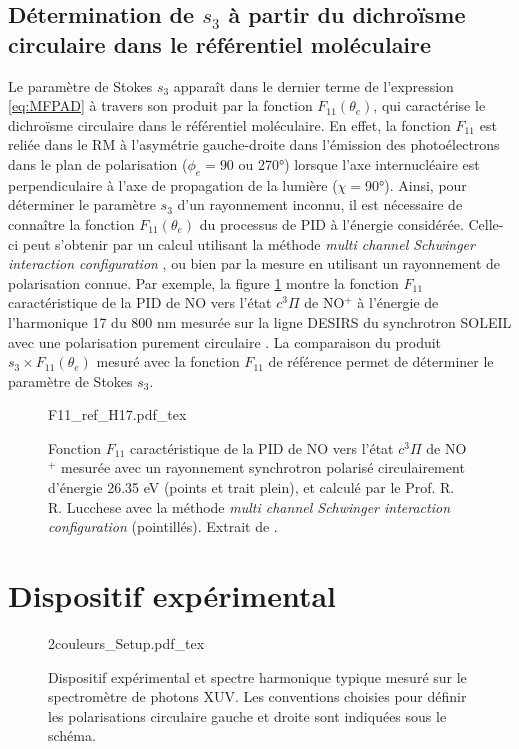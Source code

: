 \subsection{Détermination de $s_3$ à partir du dichroïsme circulaire dans le référentiel moléculaire}
Le paramètre de Stokes $s_3$ apparaît dans le dernier terme de l'expression \ref{eq:MFPAD} à travers son produit par la fonction $F_{11}(\theta_e)$, qui caractérise le dichroïsme circulaire dans le référentiel moléculaire. En effet, la fonction $F_{11}$ est reliée dans le RM à l'asymétrie gauche-droite dans l'émission des photoélectrons dans le plan de polarisation ($\phi_e = 90$ ou 270°) lorsque l'axe internucléaire est perpendiculaire à l'axe de propagation de la lumière ($\chi =$90°). Ainsi, pour déterminer le paramètre $s_3$ d'un rayonnement inconnu, il est nécessaire de connaître la fonction $F_{11}(\theta_e)$ du processus de PID à l'énergie considérée. Celle-ci peut s'obtenir par un calcul utilisant la méthode \textit{multi channel Schwinger interaction configuration} , ou bien par la mesure en utilisant un rayonnement de polarisation connue. Par exemple, la figure \ref{fig:F11_ref_H17} montre la fonction $F_{11}$ caractéristique de la PID de NO vers l'état $c ^3\Pi$ de NO$^+$ à l'énergie de l'harmonique 17 du 800 nm mesurée sur la ligne DESIRS du synchrotron SOLEIL avec une polarisation purement circulaire . La comparaison du produit $s_3 \times F_{11}(\theta_e)$ mesuré avec la fonction $F_{11}$ de référence permet de déterminer le paramètre de Stokes $s_3$. 

\begin{figure}
\centering
\def\svgwidth{0.6\textwidth}
{F11_ref_H17.pdf_tex}
\caption{Fonction $F_{11}$ caractéristique de la PID de NO vers l'état $c ^3\Pi$ de NO$^+$ mesurée avec un rayonnement synchrotron polarisé circulairement d'énergie 26.35 eV (points et trait plein), et calculé par le Prof. R. R. Lucchese avec la méthode \textit{multi channel Schwinger interaction configuration} (pointillés). Extrait de .}
\label{fig:F11_ref_H17}
\end{figure}

\section{Dispositif expérimental}
\begin{figure}
\centering
\def\svgwidth{\textwidth}
{2couleurs_Setup.pdf_tex}
\caption{Dispositif expérimental et spectre harmonique typique mesuré sur le spectromètre de photons XUV. Les conventions choisies pour définir les polarisations circulaire gauche et droite sont indiquées sous le schéma.}
\label{fig:2couleurs_Setup}
\end{figure}

